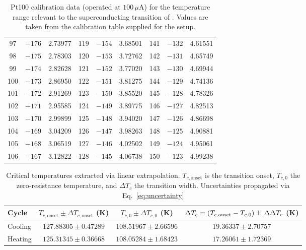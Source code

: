 \documentclass[a4paper,11pt]{article}
\numberwithin{equation}{section}
\begin{document}
\begin{table}[h]
\begin{tabular}{@{\hspace{10pt}}ccc@{\hspace{10pt}}|ccc@{\hspace{10pt}}|@{\hspace{10pt}}ccc@{\hspace{10pt}}}
    97  & $-176$ & 2.73977 & 119 & $-154$ & 3.68501 & 141 & $-132$ & 4.61551 \\
    98  & $-175$ & 2.78303 & 120 & $-153$ & 3.72762 & 142 & $-131$ & 4.65749 \\
    99  & $-174$ & 2.82628 & 121 & $-152$ & 3.77020 & 143 & $-130$ & 4.69944 \\
    100 & $-173$ & 2.86950 & 122 & $-151$ & 3.81275 & 144 & $-129$ & 4.74136 \\
    101 & $-172$ & 2.91269 & 123 & $-150$ & 3.85520 & 145 & $-128$ & 4.78326 \\
    102 & $-171$ & 2.95585 & 124 & $-149$ & 3.89775 & 146 & $-127$ & 4.82513 \\
    103 & $-170$ & 2.99899 & 125 & $-148$ & 3.94020 & 147 & $-126$ & 4.86698 \\
    104 & $-169$ & 3.04209 & 126 & $-147$ & 3.98263 & 148 & $-125$ & 4.90881 \\
    105 & $-168$ & 3.06519 & 127 & $-146$ & 4.02502 & 149 & $-124$ & 4.95061 \\
    106 & $-167$ & 3.12822 & 128 & $-145$ & 4.06738 & 150 & $-123$ & 4.99238 \\
    \bottomrule[1.5pt]
\end{tabular}
\caption{Pt100 calibration data (operated at $100\,\mu$A) for the temperature range relevant to the superconducting transition of . Values are taken from the calibration table supplied for the setup.}
\end{table}

\begin{table}[H]
\centering
\renewcommand{\arraystretch}{1.3}
\begin{tabular}{lc|c|c}
    \toprule[1.2pt]
    Cycle 
        & $T_{c,\mathrm{onset}} \pm \Delta{T_{c,\mathrm{onset}}}$ (K) 
        & $T_{c,0} \pm \Delta{T_{c,0}}$ (K) 
        & $\Delta T_c = \left(T_{c,\mathrm{onset}} - T_{c,0}\right) \pm \thinspace\Delta{\Delta{T_c}}$ (K) \\
    \midrule
    Cooling & $127.88305 \pm 0.47289$ & $108.51967 \pm 2.66596$ & $19.36337 \pm 2.70757$ \\
    Heating & $125.31345 \pm 0.36668$ & $108.05284 \pm 1.68423$ & $17.26061 \pm 1.72369$ \\
    \bottomrule[1.5pt]
\end{tabular}
\caption{Critical temperatures extracted via linear extrapolation. $T_{c,\mathrm{onset}}$ is the transition onset, $T_{c,0}$ 
the zero-resistance temperature, and $\Delta T_c$ the transition width. 
Uncertainties propagated via Eq.~\ref{eq:uncertainty}}
\label{tab:critical_temps_RvsT}
\end{table}
\end{document}
